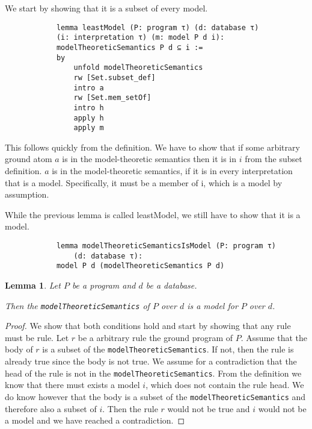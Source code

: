 \documentclass{article}
\newtheorem{lemma}{Lemma}
\begin{document}
        We start by showing that it is a subset of every model.
        \begin{lstlisting}    
            lemma leastModel (P: program τ) (d: database τ) 
            (i: interpretation τ) (m: model P d i): 
            modelTheoreticSemantics P d ⊆ i :=
            by
                unfold modelTheoreticSemantics
                rw [Set.subset_def]
                intro a
                rw [Set.mem_setOf]
                intro h
                apply h
                apply m
        \end{lstlisting}

        This follows quickly from the definition. We have to show that if some arbitrary ground atom $a$ is in the model-theoretic semantics then it is in $i$ from the subset definition. $a$ is in the model-theoretic semantics, if it is in every interpretation that is a model. Specifically, it must be a member of i, which is a model by assumption.

        While the previous lemma is called leastModel, we still have to show that it is a model.

        \begin{lstlisting}
            lemma modelTheoreticSemanticsIsModel (P: program τ) 
                (d: database τ): 
            model P d (modelTheoreticSemantics P d)
        \end{lstlisting}

        \begin{lemma}
            Let $P$ be a program and $d$ be a database. 
            
            Then the \texttt{modelTheoreticSemantics} of $P$ over $d$ is a model for $P$ over $d$.
        \end{lemma}
        \begin{proof}
            We show that both conditions hold and start by showing that any rule must be rule. Let $r$ be a arbitrary rule the ground program of $P$. Assume that the body of $r$ is a subset of the \texttt{modelTheoreticSemantics}. If not, then the rule is already true since the body is not true.
            We assume for a contradiction that the head of the rule is not in the \texttt{modelTheoreticSemantics}. From the definition we know that there must exists a model $i$, which does not contain the rule head. We do know however that the body is a subset of the \texttt{modelTheoreticSemantics} and therefore also a subset of $i$. Then the rule $r$ would not be true and $i$ would not be a model and we have reached a contradiction.
        \end{proof}
\end{document}
